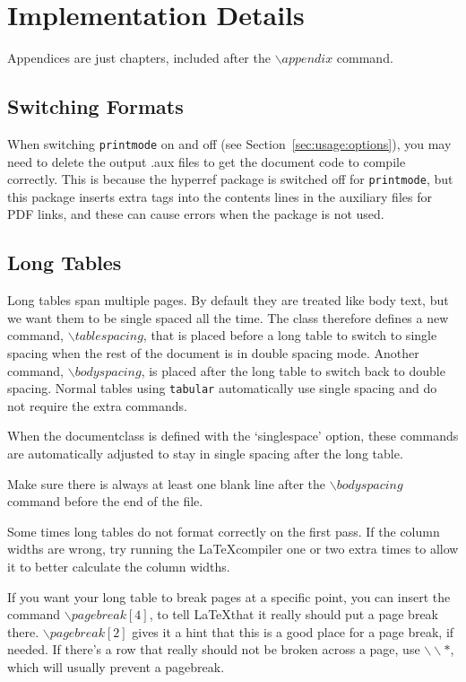 \chapter{Implementation Details\label{ch:implementation}}

Appendices are just chapters, included after the $\backslash appendix$ command.

\section{Switching Formats}
When switching \texttt{printmode} on and off (see Section~\ref{sec:usage:options}), you may need to delete the output .aux files to get the document code to compile correctly. This is because the hyperref package is switched off for \texttt{printmode}, but this package inserts extra tags into the contents lines in the auxiliary files for PDF links, and these can cause errors when the package is not used.

\section{Long Tables}

Long tables span multiple pages. By default they are treated like body text, but we want them to be single spaced all the time. The class therefore defines a new command, $\backslash tablespacing$, that is placed before a long table to switch to single spacing when the rest of the document is in double spacing mode. Another command, $\backslash bodyspacing$, is placed after the long table to switch back to double spacing. Normal tables using \texttt{tabular} automatically use single spacing and do not require the extra commands.

When the documentclass is defined with the `singlespace' option, these commands are automatically adjusted to stay in single spacing after the long table.

Make sure there is always at least one blank line after the $\backslash bodyspacing$ command before the end of the file.

Some times long tables do not format correctly on the first pass. If the column widths are wrong, try running the \LaTeX compiler one or two extra times to allow it to better calculate the column widths.

If you want your long table to break pages at a specific point, you can insert the command $\backslash pagebreak[4]$, to tell \LaTeX that it really should put a page break there. $\backslash pagebreak[2]$ gives it a hint that this is a good place for a page break, if needed. If there's a row that really should not be broken across a page, use $\backslash \backslash *$, which will usually prevent a pagebreak. 

